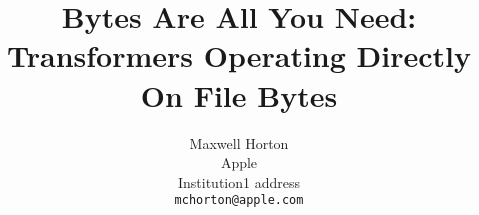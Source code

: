 \documentclass[10pt,twocolumn,letterpaper]{article}
\begin{document}
\title{Bytes Are All You Need: Transformers Operating Directly On File Bytes}

\author{Maxwell Horton \\
Apple \\
Institution1 address\\
{\tt\small mchorton@apple.com}
}

\maketitle
\ificcvfinal\thispagestyle{empty}\fi


\begin{abstract}
 
\end{abstract}



{\small


}

\end{document}

